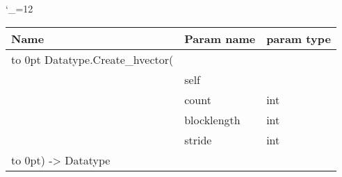 \begingroup \catcode`\_=12 \tt
\begin{tabular}{lll}
\toprule
\textrm{Name}&\textrm{Param name}&\textrm{param type}\\
\midrule
\hbox to 0pt {Datatype.Create_hvector(\hss}\\
& self\\
& count & int\\
& blocklength & int\\
& stride & int\\
\hbox to 0pt{) -> Datatype\hss}\\
\bottomrule
\end{tabular}
\endgroup

